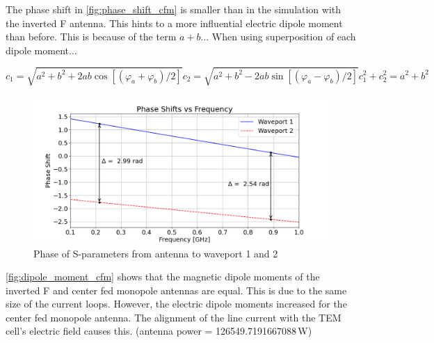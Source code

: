 The phase shift in \autoref{fig:phase_shift_cfm} is smaller than in the simulation with the inverted F antenna. This hints to a more influential electric dipole moment than before. This is because of the term $a+b$... When using superposition of each dipole moment...

\begin{subequations}
    \begin{equation}
        c_1 = \sqrt{a^2+b^2+2ab\cos{\left[ (\varphi_a + \varphi_b) / 2 \right]}}
    \end{equation}
        \begin{equation}
        c_2 = \sqrt{a^2+b^2-2ab\sin{\left[ (\varphi_a - \varphi_b) / 2 \right]}}
    \end{equation}
    \begin{equation}
        c_1^2+c_2^2= a^2+b^2
    \end{equation}
\end{subequations}
    

\begin{figure}[h]
    \centering
    \includegraphics[width=1\linewidth]{content//30_simulations//img/phase_shift_cfm.png}
    \caption{Phase of S-parameters from antenna to waveport 1 and 2}
    \label{fig:phase_shift_cfm}
\end{figure}

\autoref{fig:dipole_moment_cfm} shows that the magnetic dipole moments of the inverted F and center fed monopole antennas are equal. This is due to the same size of the current loops. However, the electric dipole moments increased for the center fed monopole antenna. The alignment of the line current with the TEM cell's electric field causes this. (antenna power = 126549.7191667088\,W)


